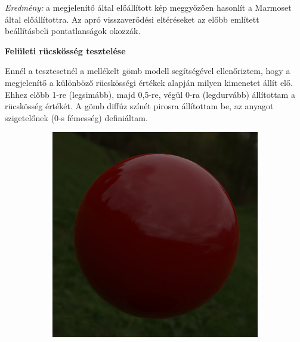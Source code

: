 \textit{Eredmény:} a megjelenítő által előállított kép meggyőzően hasonlít a Marmoset által előállítottra. Az apró visszaverődési eltéréseket az előbb említett beállításbeli pontatlanságok okozzák.

\vspace{15pt}

\noindent
\textbf{Felületi rücskösség tesztelése}

Ennél a tesztesetnél a mellékelt gömb modell segítségével ellenőriztem, hogy a megjelenítő a különböző rücskösségi értékek alapján milyen kimenetet állít elő. Ehhez előbb 1-re (legsimább), majd 0,5-re, végül 0-ra (legdurvább) állítottam a rücskösség értékét. A gömb diffúz színét pirosra állítottam be, az anyagot szigetelőnek (0-s fémesség) definiáltam.

\begin{figure}[!ht]
    \centering
    \begin{subfigure}[b]{0.28\textwidth}
        \centering
        \includegraphics[width=\textwidth]{images/scr_r1.png}
    \end{subfigure}
    \hfill
    \begin{subfigure}[b]{0.28\textwidth}
        \centering

\end{subfigure}
\end{figure}
